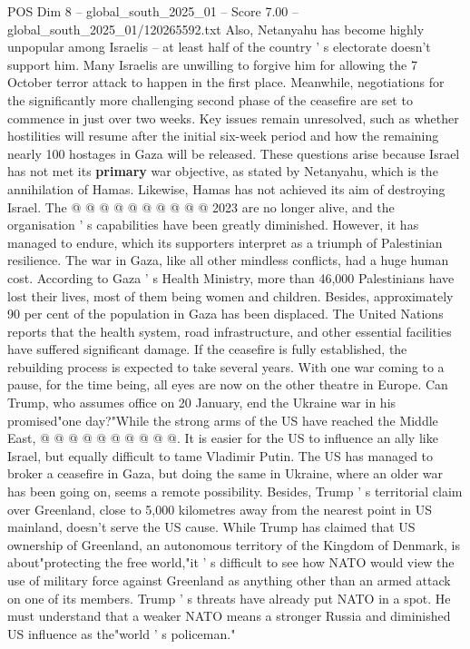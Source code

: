 \begin{textsample}{POS Dim 8 – global\_south\_2025\_01 – Score 7.00 – global\_south\_2025\_01/120265592.txt}
Also, Netanyahu has become highly unpopular among Israelis -- at least half of the country ' s electorate doesn't support him.
Many Israelis are unwilling to forgive him for allowing the 7 October terror attack to happen in the first place.
Meanwhile, negotiations for the significantly more challenging second phase of the ceasefire are set to commence in just over two weeks.
Key issues remain unresolved, such as whether hostilities will resume after the initial six-week period and how the remaining nearly 100 hostages in Gaza will be released.
These questions arise because Israel has not met its \textbf{primary} war objective, as stated by Netanyahu, which is the annihilation of Hamas.
Likewise, Hamas has not achieved its aim of destroying Israel.
The @ @ @ @ @ @ @ @ @ @ 2023 are no longer alive, and the organisation ' s capabilities have been greatly diminished.
However, it has managed to endure, which its supporters interpret as a triumph of Palestinian resilience.
The war in Gaza, like all other mindless conflicts, had a huge human cost.
According to Gaza ' s Health Ministry, more than 46,000 Palestinians have lost their lives, most of them being women and children.
Besides, approximately 90 per cent of the population in Gaza has been displaced.
The United Nations reports that the health system, road infrastructure, and other essential facilities have suffered significant damage.
If the ceasefire is fully established, the rebuilding process is expected to take several years.
With one war coming to a pause, for the time being, all eyes are now on the other theatre in Europe.
Can Trump, who assumes office on 20 January, end the Ukraine war in his promised"one day?"While the strong arms of the US have reached the Middle East, @ @ @ @ @ @ @ @ @ @.
It is easier for the US to influence an ally like Israel, but equally difficult to tame Vladimir Putin.
The US has managed to broker a ceasefire in Gaza, but doing the same in Ukraine, where an older war has been going on, seems a remote possibility.
Besides, Trump ' s territorial claim over Greenland, close to 5,000 kilometres away from the nearest point in US mainland, doesn't serve the US cause.
While Trump has claimed that US ownership of Greenland, an autonomous territory of the Kingdom of Denmark, is about"protecting the free world,"it ' s difficult to see how NATO would view the use of military force against Greenland as anything other than an armed attack on one of its members.
Trump ' s threats have already put NATO in a spot.
He must understand that a weaker NATO means a stronger Russia and diminished US influence as the"world ' s policeman."

\end{textsample}
